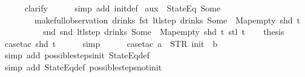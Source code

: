\begin{isabellebody}
\ \ \ \ \isamarkupfalse%
\ clarify\isanewline
\ \ \ \ \isamarkupfalse%
\ {\isacharparenleft}simp\ add{\isacharcolon}\ init{\isacharunderscore}def{\isacharparenright}%
\endisatagproof
{\isafoldproof}%
%
\isadelimproof
\isanewline
%
\endisadelimproof
\isanewline
{}\isamarkupfalse%
\ aux{}{\isacharcolon}\ {\isachardoublequoteopen}{\isasymnot}\ StateEq\ {\isacharparenleft}Some\ {}{\isacharparenright}\isanewline
\ \ \ \ \ \ \ \ {\isacharparenleft}make{\isacharunderscore}full{\isacharunderscore}observation\ drinks\ {\isacharparenleft}fst\ {\isacharparenleft}ltl{\isacharunderscore}step\ drinks\ {\isacharparenleft}Some\ {}{\isacharparenright}\ Map{\isachardot}empty\ {\isacharparenleft}shd\ t{\isacharparenright}{\isacharparenright}{\isacharparenright}\isanewline
\ \ \ \ \ \ \ \ \ \ {\isacharparenleft}snd\ {\isacharparenleft}snd\ {\isacharparenleft}ltl{\isacharunderscore}step\ drinks\ {\isacharparenleft}Some\ {}{\isacharparenright}\ Map{\isachardot}empty\ {\isacharparenleft}shd\ t{\isacharparenright}{\isacharparenright}{\isacharparenright}{\isacharparenright}\ {\isacharparenleft}stl\ t{\isacharparenright}{\isacharparenright}{\isachardoublequoteclose}\isanewline
%
\isadelimproof
%
\endisadelimproof
%
\isatagproof
{}\isamarkupfalse%
{\isacharminus}\isanewline
\ \ \isamarkupfalse%
\ {\isacharquery}thesis\isanewline
\ \ \ \ \isamarkupfalse%
\ {\isacharparenleft}case{\isacharunderscore}tac\ {\isachardoublequoteopen}shd\ t{\isachardoublequoteclose}{\isacharparenright}\isanewline
\ \ \ \ \isamarkupfalse%
\ simp\isanewline
\ \ \ \ \isamarkupfalse%
\ {\isacharparenleft}case{\isacharunderscore}tac\ {\isachardoublequoteopen}a\ {\isacharequal}\ STR\ {\isacharprime}{\isacharprime}init{\isacharprime}{\isacharprime}\ {\isasymand}\ b\ {\isacharequal}\ {\isacharbrackleft}{\isacharbrackright}{\isachardoublequoteclose}{\isacharparenright}\isanewline
\ \ \ \ \ \isamarkupfalse%
\ {\isacharparenleft}simp\ add{\isacharcolon}\ possible{\isacharunderscore}steps{\isacharunderscore}init\ StateEq{\isacharunderscore}def{\isacharparenright}\isanewline
\ \ \ \ \isamarkupfalse%
\ {\isacharparenleft}simp\ add{\isacharcolon}\ StateEq{\isacharunderscore}def\ possible{\isacharunderscore}steps{\isacharunderscore}not{\isacharunderscore}init{\isacharparenright}\isanewline
{}\isamarkupfalse%
%
\endisatagproof
{\isafoldproof}%
%
\isadelimproof
\isanewline
%
\endisadelimproof
\isanewline

\end{isabellebody}
